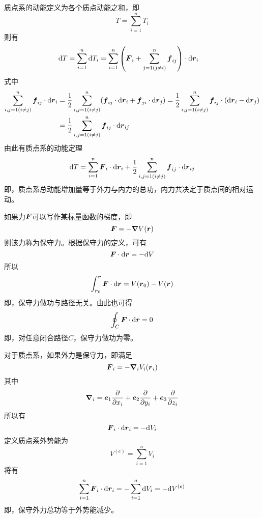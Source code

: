 质点系的动能定义为各个质点动能之和，即
\begin{equation}
	T = \sum_{i=1}^n T_i
\end{equation}
则有
\begin{align*}
	\mathrm{d} T & = \sum_{i=1}^n \mathrm{d} T_i = \sum_{i=1}^n \left(\boldsymbol{F}_i + \sum_{j=1(j\neq i)}^n \boldsymbol{f}_{ij}\right) \cdot \mathrm{d} \boldsymbol{r}_i
\end{align*}
式中
\begin{align*}
	\sum_{i,j=1(i\neq j)}^n \boldsymbol{f}_{ij} \cdot \mathrm{d} \boldsymbol{r}_i & = \frac12 \sum_{i,j=1(i\neq j)}^n (\boldsymbol{f}_{ij} \cdot \mathrm{d} \boldsymbol{r}_i +\boldsymbol{f}_{ji} \cdot \mathrm{d} \boldsymbol{r}_j) = \frac12 \sum_{i,j=1(i\neq j)}^n \boldsymbol{f}_{ij} \cdot (\mathrm{d}\boldsymbol{r}_i - \mathrm{d} \boldsymbol{r}_j) \\
	& = \frac12 \sum_{i,j=1(i\neq j)}^n \boldsymbol{f}_{ij} \cdot \mathrm{d} \boldsymbol{r}_{ij}
\end{align*}
由此有{\heiti 质点系的动能定理}
\begin{equation}
	\mathrm{d} T = \sum_{i=1}^n \boldsymbol{F}_i \cdot \mathrm{d} \boldsymbol{r}_i + \frac12 \sum_{i,j=1(i\neq j)}^n \boldsymbol{f}_{ij} \cdot \mathrm{d} \boldsymbol{r}_{ij}
\end{equation}
即，质点系总动能增加量等于外力与内力的总功，内力共决定于质点间的相对运动。

如果力$\boldsymbol{F}$可以写作某标量函数的梯度，即
\begin{equation}
	\boldsymbol{F} = -\boldsymbol{\nabla} V(\boldsymbol{r})
\end{equation}
则该力称为{\heiti 保守力}。根据保守力的定义，可有
\begin{equation}
	\boldsymbol{F} \cdot \mathrm{d} \boldsymbol{r} = -\mathrm{d}V
\end{equation}
所以
\begin{equation*}
	\int_{\boldsymbol{r}_0}^{\boldsymbol{r}} \boldsymbol{F} \cdot \mathrm{d} \boldsymbol{r} = V(\boldsymbol{r}_0) - V(\boldsymbol{r})
\end{equation*}
即，保守力做功与路径无关。由此也可得
\begin{equation}
	\oint_C \boldsymbol{F} \cdot \mathrm{d} \boldsymbol{r} = 0
\end{equation}
即，对任意闭合路径$C$，保守力做功为零。

对于质点系，如果外力是保守力，即满足
\begin{equation}
	\boldsymbol{F}_i = -\boldsymbol{\nabla}_i V_i(\boldsymbol{r}_i)
\end{equation}
其中
\begin{equation}
	\boldsymbol{\nabla}_i = \boldsymbol{e}_1 \frac{\partial}{\partial x_i} + \boldsymbol{e}_2 \frac{\partial}{\partial y_i} + \boldsymbol{e}_3 \frac{\partial}{\partial z_i}
\end{equation}
所以有
\begin{equation}
	\boldsymbol{F}_i \cdot \mathrm{d} \boldsymbol{r}_i = -\mathrm{d} V_i
\end{equation}
定义{\heiti 质点系外势能}为
\begin{equation}
	V^{(e)} = \sum_{i=1}^n V_i
\end{equation}
将有
\begin{equation}
	\sum_{i=1}^n \boldsymbol{F}_i \cdot \mathrm{d} \boldsymbol{r}_i = -\sum_{i=1}^n \mathrm{d} V_i = -\mathrm{d} V^{(e)}
\end{equation}
即，保守外力总功等于外势能减少。

